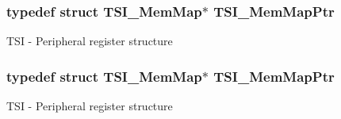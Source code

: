 \subsubsection[{\texorpdfstring{T\+S\+I\+\_\+\+Mem\+Map\+Ptr}{TSI_MemMapPtr}}]{\setlength{\rightskip}{0pt plus 5cm}typedef struct {\bf T\+S\+I\+\_\+\+Mem\+Map}$\ast$ {\bf T\+S\+I\+\_\+\+Mem\+Map\+Ptr}}\hypertarget{group___t_s_i___peripheral_gad1310fedc6b594554cdd760e371de570}{}\label{group___t_s_i___peripheral_gad1310fedc6b594554cdd760e371de570}
T\+SI -\/ Peripheral register structure 
\subsubsection[{\texorpdfstring{T\+S\+I\+\_\+\+Mem\+Map\+Ptr}{TSI_MemMapPtr}}]{\setlength{\rightskip}{0pt plus 5cm}typedef struct {\bf T\+S\+I\+\_\+\+Mem\+Map}$\ast$ {\bf T\+S\+I\+\_\+\+Mem\+Map\+Ptr}}\hypertarget{group___t_s_i___peripheral_gad1310fedc6b594554cdd760e371de570}{}\label{group___t_s_i___peripheral_gad1310fedc6b594554cdd760e371de570}
T\+SI -\/ Peripheral register structure 